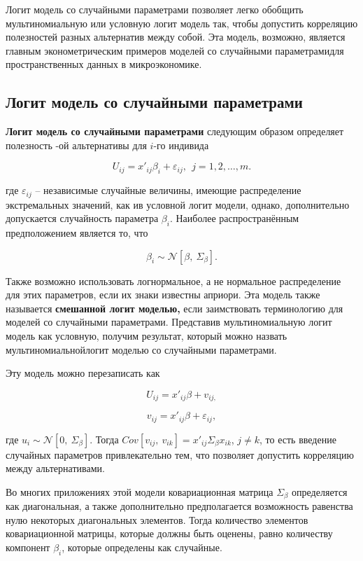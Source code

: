 Логит модель со случайными параметрами позволяет легко обобщить мультиномиальную или условную логит модель так, чтобы допустить корреляцию полезностей разных альтернатив между собой. Эта модель, возможно, является главным эконометрическим примеров моделей со случайными параметрамидля пространственных данных в микроэкономике.

\subsection{Логит модель со случайными параметрами}

\textbf{Логит модель со случайными параметрами }следующим образом определяет полезность -ой альтернативы для $i$-го индивида

\begin{equation} \label{GrindEQ__15_39_} U_{ij}=x'_{ij}{\beta }_i+{\varepsilon }_{ij},\ \ j=1,2,\dots ,m. \end{equation} 

где ${\varepsilon }_{ij}$ -- независимые случайные величины, имеющие распределение экстремальных значений, как ив условной логит модели, однако, дополнительно допускается случайность параметра ${\beta }_i$. Наиболее распространённым предположением является то, что 

\begin{equation} \label{GrindEQ__15_40_} {\beta }_i\sim {\mathcal N}\left[\beta ,\ {\Sigma }_{\beta }\right]. \end{equation} 

Также возможно использовать логнормальное, а не нормальное распределение для этих параметров, если их знаки известны априори. Эта модель также называется \textbf{смешанной логит моделью, }если заимствовать терминологию для моделей со случайными параметрами. Представив мультиномиальную логит модель как условную, получим результат, который можно назвать мультиномиальнойлогит моделью со случайными параметрами.

Эту модель можно перезаписать как

\[U_{ij}=x'_{ij}\beta +v_{ij,}\] 

\[v_{ij}=x'_{ij}\beta +{\varepsilon }_{ij},\] 

где $u_i\sim {\mathcal N}\left[0,\ {\Sigma }_{\beta }\right].$ Тогда $Cov\left[v_{ij},\ v_{ik}\right]=x'_{ij}{\Sigma }_{\beta }x_{ik}$, $j\ne k$, то есть введение случайных параметров привлекательно тем, что позволяет допустить корреляцию между альтернативами.

Во многих приложениях этой модели ковариационная матрица ${\Sigma }_{\beta }$ определяется как диагональная, а также дополнительно предполагается возможность равенства нулю некоторых диагональных элементов. Тогда количество элементов ковариационной матрицы, которые должны быть оценены, равно количеству компонент ${\beta }_i$, которые определены как случайные.

